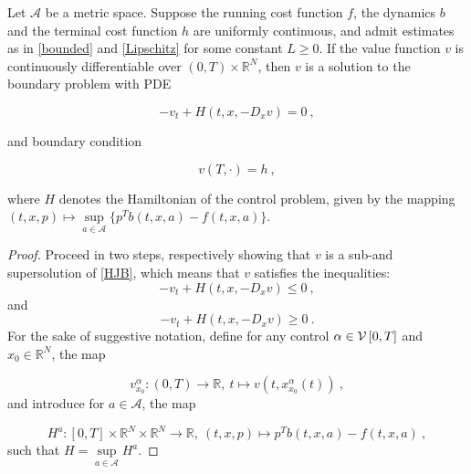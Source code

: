 

\begin{theorem}
	\label{classical solution HJB}
	Let $ \mathcal{A} $ be a metric space. Suppose the running cost function $ f $, the dynamics $ b $ and the terminal cost function $ h $ are uniformly continuous, and admit estimates as in \ref{bounded} and \ref{Lipschitz} for some constant $ L \geq 0 $. If the value function $ v $ is continuously differentiable over $ \left( 0, T \right) \times \mathbb{R}^N $, then $ v $ is a solution to the boundary problem with PDE
	
	\begin{equation}
		\label{HJB}
		-v_t + H(t, x, -D_x v) = 0 \ ,
	\end{equation}
	
	and boundary condition
	
	\begin{equation}
		\label{boundary}
		v(T, \cdot) = h \ ,
	\end{equation}
	
	where $ H $ denotes the Hamiltonian of the control problem, given by the mapping $ (t, x, p) \mapsto \sup\limits_{a \in \mathcal{A}} \bigg\{ p^{T} b(t, x, a) - f(t, x, a) \bigg\} $.
	\begin{proof}
		Proceed in two steps, respectively showing that $ v $ is a sub-and supersolution of \ref{HJB}, which means that $ v $ satisfies the inequalities:
		\begin{equation}
			\label{value_subsolution}
			-v_t + H(t, x, -D_x v) \leq 0 \ ,
		\end{equation}
		and 
		\begin{equation}
			\label{value_supersolution}
			-v_t + H(t, x, - D_x v) \geq 0 \ .
		\end{equation}
		For the sake of suggestive notation, define for any control $ \alpha \in \mathcal{V}\left[ {0}, T \right] $ and $ x_0 \in \mathbb{R}^N $, the map
		
		\begin{equation*}
			v^{\alpha}_{x_0} : \left( 0 , T \right) \to \mathbb{R}, \ t \mapsto v(t, x^{\alpha}_{x_0}(t)) \ ,
		\end{equation*}
		and introduce for $ a \in \mathcal{A} $, the map
		
		\begin{equation*}
			H^{a} : \left[ 0, T \right] \times \mathbb{R}^{N} \times \mathbb{R}^N \to \mathbb{R}, \ (t, x, p) \mapsto p^{T} b(t, x, a) - f(t, x, a) \ ,
		\end{equation*}
		such that $ H = \sup\limits_{a \in \mathcal{A}} H^{a} $.
		

\end{proof}
\end{theorem}
